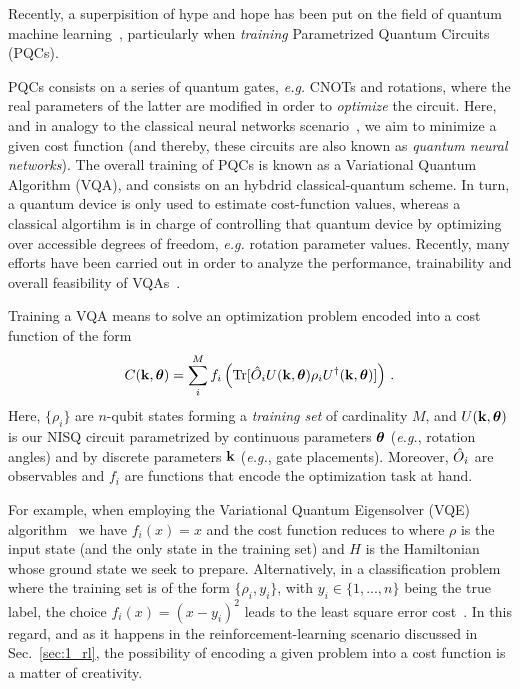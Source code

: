 Recently, a superpisition of hype and hope has been put on the  %
field of quantum machine learning~\cite{biamonte2017quantum, supremacygoogle, schuld2021isquantum, Aaronson2015, preskill2018quantum, peruzzo2014variational, pesah2021absense,sharma2022reformulation}, particularly when \textit{training} Parametrized Quantum Circuits (PQCs).

PQCs consists on a series of quantum gates, \textit{e.g.} CNOTs and rotations, where the real parameters of the latter are modified in order to \textit{optimize} the circuit. Here, and in analogy to the classical neural networks scenario~\cite{Goodfellow-et-al-2016}, we aim to minimize a given cost function (and thereby, these circuits are also known as \textit{quantum neural networks}). The overall training of PQCs is known as a Variational Quantum Algorithm (VQA), and consists on an hybdrid classical-quantum scheme. In turn, a quantum device is only used to estimate cost-function values, whereas a classical algortihm is in charge of controlling that quantum device by optimizing over accessible degrees of freedom, \textit{e.g.} rotation parameter values. Recently, many efforts have been carried out in order to analyze the performance, trainability and overall feasibility of VQAs~\cite{VQA_revmarco, VQA_revalba}.

Training a VQA means to solve an optimization problem encoded into a cost function of the form
\begin{equation}\label{eq:cost}
    C(\mathbf{k},\bm{\theta})=\sum_i^M f_i\left(\text{Tr}[\hat{O}_i U(\mathbf{k},\bm{\theta})\rho_i U^\dagger (\mathbf{k},\bm{\theta})]\right)  \,.
\end{equation}
Here, $\{\rho_i\}$ are $n$-qubit states forming a \textit{training set} of cardinality $M$, and $U(\mathbf{k},\bm{\theta})$ is our NISQ circuit parametrized by continuous parameters $\bm{\theta}$ (\textit{e.g.}, rotation angles) and by discrete parameters $\mathbf{k}$ (\textit{e.g.}, gate placements). Moreover, $\hat{O}_i$ are observables and $f_i$ are functions that encode the optimization task at hand.

For example, when employing the Variational Quantum Eigensolver (VQE) algorithm~\cite{peruzzo2014variational} we have $f_i(x)=x$ and the cost function reduces to
where $\rho$ is the input state (and the only state in the training set) and $H$ is the Hamiltonian whose ground state we seek to prepare. Alternatively, in a classification problem where the training set is of the form $\{\rho_i,y_i\}$, with $y_i\in \{1,...,n\}$ being the true label, the choice $f_i(x)=(x-y_i)^2$ leads to the least square error cost~\cite{classiVQA, vqaclass1, vqaclass2,vqaclass4, cong2019quantum}.
In this regard, and as it happens in the reinforcement-learning scenario discussed in Sec.~\ref{sec:1_rl}, the possibility of encoding a given problem into a cost function is a matter of creativity.


